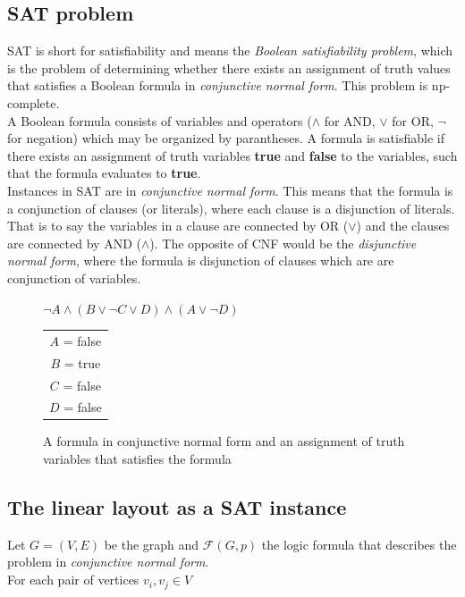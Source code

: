 \subsection{SAT problem}
SAT is short for satisfiability and means the \textit{Boolean satisfiability problem}, which is the problem of determining whether there exists an assignment of truth values that satisfies a Boolean formula in \textit{conjunctive normal form}. This problem is np-complete. \\
A Boolean formula consists of variables and operators ($\land$ for AND, $\lor$ for OR, $\neg$ for negation) which may be organized by parantheses. A formula is satisfiable if there exists an assignment of truth variables \textbf{true} and \textbf{false} to the variables, such that the formula evaluates to \textbf{true}.\\
Instances in SAT are in \textit{conjunctive normal form}.
This means that the formula is a conjunction of clauses (or literals), where each clause is a disjunction of literals. That is to say the variables in a clause are connected by OR ($\lor$) and the clauses are connected by AND ($\land$). The opposite of CNF would be the \textit{disjunctive normal form}, where the formula is disjunction of clauses which are are conjunction of variables. 
\begin{figure}[!h]
\begin{center}
$\lnot A \land (B \lor \lnot C \lor D) \land (A \lor \lnot D)$\\[5px]
\begin{tabular}{c}
$A$ = false\\
$B$ = true\\
$C$ = false\\
$D$ = false\\
\end{tabular}
\caption{A formula in conjunctive normal form and an assignment of truth variables that satisfies the formula}
\label{cnf}
\end{center}
\end{figure}
\subsection{The linear layout as a SAT instance}
Let $G=(V,E)$ be the graph and $\mathcal{F}(G,p)$ the logic formula that describes the problem in \textit{conjunctive normal form}.\\
For each pair of vertices $v_i, v_j \in V$ 
